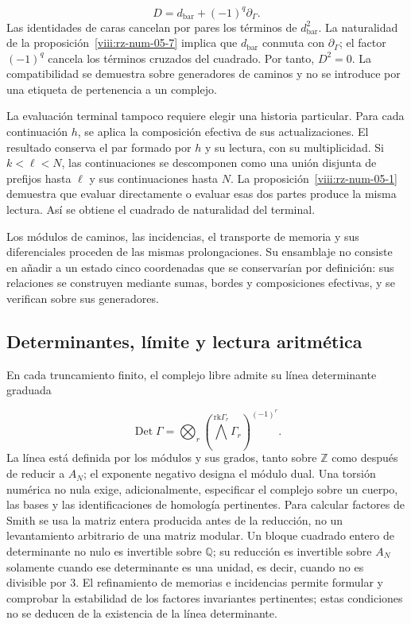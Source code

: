 \[
D=d_{\mathrm{bar}}+(-1)^q\partial_\Gamma.
\]
Las identidades de caras cancelan por pares los términos de \(d_{\mathrm{bar}}^2\). La naturalidad de la proposición~\ref{viii:rz-num-05-7} implica que \(d_{\mathrm{bar}}\) conmuta con \(\partial_\Gamma\); el factor \((-1)^q\) cancela los términos cruzados del cuadrado. Por tanto, \(D^2=0\). La compatibilidad se demuestra sobre generadores de caminos y no se introduce por una etiqueta de pertenencia a un complejo.

La evaluación terminal tampoco requiere elegir una historia particular. Para cada continuación \(h\), se aplica la composición efectiva de sus actualizaciones. El resultado conserva el par formado por \(h\) y su lectura, con su multiplicidad. Si \(k<\ell<N\), las continuaciones se descomponen como una unión disjunta de prefijos hasta \(\ell\) y sus continuaciones hasta \(N\). La proposición~\ref{viii:rz-num-05-1} demuestra que evaluar directamente o evaluar esas dos partes produce la misma lectura. Así se obtiene el cuadrado de naturalidad del terminal.

Los módulos de caminos, las incidencias, el transporte de memoria y sus diferenciales proceden de las mismas prolongaciones. Su ensamblaje no consiste en añadir a un estado cinco coordenadas que se conservarían por definición: sus relaciones se construyen mediante sumas, bordes y composiciones efectivas, y se verifican sobre sus generadores.

\subsection{Determinantes, límite y lectura aritmética}
En cada truncamiento finito, el complejo libre admite su línea determinante graduada

\[
\operatorname{Det}\Gamma=
\bigotimes_r\left(\bigwedge^{\mathrm{rk}\Gamma_r}\Gamma_r\right)^{(-1)^r}.
\]
La línea está definida por los módulos y sus grados, tanto sobre \(\mathbb Z\) como después de reducir a \(A_N\); el exponente negativo designa el módulo dual. Una torsión numérica no nula exige, adicionalmente, especificar el complejo sobre un cuerpo, las bases y las identificaciones de homología pertinentes. Para calcular factores de Smith se usa la matriz entera producida antes de la reducción, no un levantamiento arbitrario de una matriz modular. Un bloque cuadrado entero de determinante no nulo es invertible sobre \(\mathbb Q\); su reducción es invertible sobre \(A_N\) solamente cuando ese determinante es una unidad, es decir, cuando no es divisible por \(3\). El refinamiento de memorias e incidencias permite formular y comprobar la estabilidad de los factores invariantes pertinentes; estas condiciones no se deducen de la existencia de la línea determinante.

